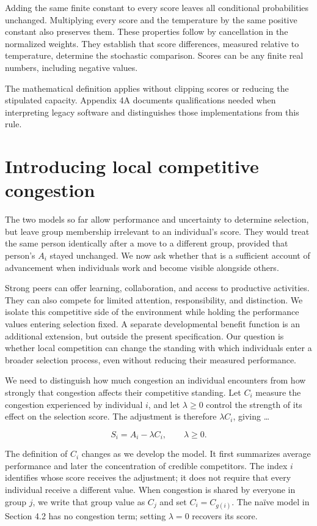 Adding the same finite constant to every score leaves all conditional probabilities unchanged. Multiplying every score and the temperature by the same positive constant also preserves them. These properties follow by cancellation in the normalized weights. They establish that score differences, measured relative to temperature, determine the stochastic comparison. Scores can be any finite real numbers, including negative values.

The mathematical definition applies without clipping scores or reducing the stipulated capacity. Appendix 4A documents qualifications needed when interpreting legacy software and distinguishes those implementations from this rule.

\section{Introducing local competitive congestion}\label{introducing-local-competitive-congestion}

The two models so far allow performance and uncertainty to determine selection, but leave group membership irrelevant to an individual's score. They would treat the same person identically after a move to a different group, provided that person's \(A_{i}\) stayed unchanged. We now ask whether that is a sufficient account of advancement when individuals work and become visible alongside others.

Strong peers can offer learning, collaboration, and access to productive activities. They can also compete for limited attention, responsibility, and distinction. We isolate this competitive side of the environment while holding the performance values entering selection fixed. A separate developmental benefit function is an additional extension, but outside the present specification. Our question is whether local competition can change the standing with which individuals enter a broader selection process, even without reducing their measured performance.

We need to distinguish how much congestion an individual encounters from how strongly that congestion affects their competitive standing. Let \(C_i\) measure the congestion experienced by individual \(i\), and let \(\lambda\geq0\) control the strength of its effect on the selection score. The adjustment is therefore \(\lambda C_i\), giving \ldots{}

\[
S_i=A_i-\lambda C_i,\qquad \lambda\geq 0.
\]

The definition of \(C_i\) changes as we develop the model. It first summarizes average performance and later the concentration of credible competitors. The index \(i\) identifies whose score receives the adjustment; it does not require that every individual receive a different value. When congestion is shared by everyone in group \(j\), we write that group value as \(C_j\) and set \(C_i=C_{g(i)}\). The naïve model in Section 4.2 has no congestion term; setting \(\lambda=0\) recovers its score.

